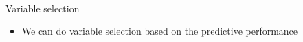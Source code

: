 \documentclass[english,t]{beamer}
\begin{document}
\begin{frame}{}
{\begin{minipage}[b][8.1cm][t]{12.1cm}
      \\
\end{minipage}
}
\end{frame}

\begin{frame}{Variable selection}

  \begin{itemize}
  \item We can do variable selection based on the predictive
    performance
  \end{itemize}


\end{frame}
\end{document}
